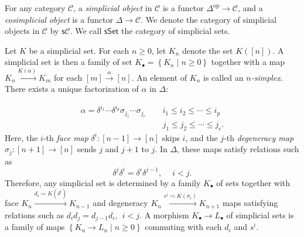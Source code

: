 \documentclass[10pt,letterpaper,cm]{nupset}
\theoremstyle{definition}
\theoremstyle{theorem}
\theoremstyle{remark}
\newcommand{\1}{\mathbb{1}}
\renewcommand{\c}{\mathcal{C}}
\newcommand{\0}{\vec 0}
\DeclareMathOperator{\op}{op}
\begin{document}
For any category $\c$, a \textit{simplicial object} in $\c$ is a functor $\Delta^{\op} \to \c$, and a \textit{cosimplicial object} is a functor $\Delta \to \c$. We denote the category of simplicial objects in $\c$ by $\mathsf{s}{\c}$. We call $\mathsf{sSet}$ the category of simplicial sets. 

\medskip

Let $K$ be a simplicial set. For each $ n \geq 0$, let $K_n$ denote the set $K(\left[n\right])$. A simplicial set is then a family of set $K_{\bullet} = \left\{K_n \mid n \geq 0\right\}$ together with a map $K_n \xrightarrow{K(\alpha)} K_m$ for each $\left[m\right] \xrightarrow{\alpha} \left[n\right]$. An element of $K_n$ is called an \textit{$n$-simplex}. There exists a unique factorization of $\alpha$ in $\Delta$:

\begin{align*}
\alpha = \delta^{i_1} \cdots \delta^{i_p} \sigma_{j_1} \cdots \sigma_{j_e} \quad \ & i_1\leq i_2 \leq \cdots \leq i_p
\\ & j_1 \leq j_2 \leq \cdots \leq j_e.
\end{align*}
Here, the $i$-th \textit{face map} $\delta^i : \left[n-1\right] \to \left[n\right]$ skips $i$, and the $j$-th \textit{degeneracy map} $\sigma_j : \left[n+1\right] \to \left[n\right]$ sends $j$ and $j+1$ to $j$. In $\Delta$, these maps satisfy relations such as
\[
\delta^j\delta^i = \delta^i\delta^{j-1}, \ \quad i<j
.\] Therefore, any simplicial set is determined by a family $K_{\bullet}$ of sets together with face $K_n \xrightarrow{d_i \coloneqq K(\delta^i)} K_{n-1}$ and degeneracy $K_n \xrightarrow{s^i \coloneqq K(\sigma_i)} K_{n+1}$ maps satisfying relations such as $d_id_j = d_{j-1}d_i, \  \ i< j$. A morphism $K_{\bullet} \to L_{\bullet}$ of simplicial sets is a family of maps $\left\{K_n \to L_n \mid n \geq 0\right\}$ commuting with each $d_i$ and $s^i$. 
\end{document}
